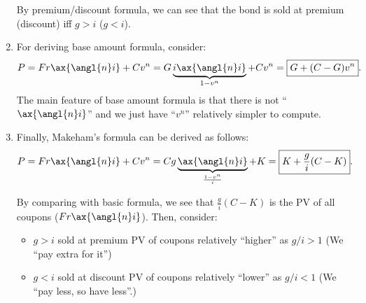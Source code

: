 \begin{enumerate}
\begin{note}
By premium/discount formula, we can see that the bond is sold at premium (discount) iff \(g>i\) (\(g<i\)).
\end{note}

\item \label{it:bond-base-amt-fmla}
For deriving base amount formula, consider:
\[
P=Fr\ax{\angl{n}i}+Cv^n
=G\underbrace{i\ax{\angl{n}i}}_{1-v^n}+Cv^n
=\boxed{G+(C-G)v^n}.
\]
The main feature of base amount formula is that there is not
``\(\ax{\angl{n}i}\)'' and we just have ``\(v^n\)'' 
relatively simpler to compute.
\item \label{it:bond-base-amt-fmla}
Finally, Makeham's formula can be derived as follows:
\[
P=Fr\ax{\angl{n}i}+Cv^n
=Cg\underbrace{\ax{\angl{n}i}}_{\mathclap{\frac{1-v^n}{i}}}+K
=\boxed{K+\frac{g}{i}(C-K)}.
\]
\begin{intuition}
By comparing with basic formula, we see that \(\displaystyle \frac{g}{i}(C-K)\)
is the PV of all coupons (\(Fr\ax{\angl{n}i}\)). Then, consider:
\begin{itemize}
\item \(g>i\)  sold at premium  PV of coupons relatively ``higher'' as \(g/i>1\) (We ``pay extra for it'')
\item \(g<i\)  sold at discount  PV of coupons relatively ``lower'' as \(g/i<1\) (We ``pay less, so have less''.)
\end{itemize}
\end{intuition}
\end{enumerate}
